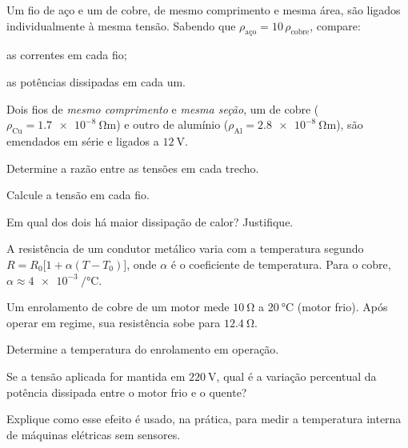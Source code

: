 \blocoaprofundamento
\begin{questao}[3]{}

Um fio de aço e um de cobre, de mesmo comprimento e mesma área, são ligados
individualmente à mesma tensão. Sabendo que
$\rho_{\text{aço}} = 10\,\rho_{\text{cobre}}$, compare:
\begin{itensq}
\item as correntes em cada fio;
\item as potências dissipadas em cada um.
\end{itensq}


\end{questao}
\begin{questao}[3]{}

Dois fios de \emph{mesmo comprimento} e \emph{mesma seção}, um de cobre
($\rho_{\text{Cu}}=\SI{1.7e-8}{\ohm\meter}$) e outro de alumínio
($\rho_{\text{Al}}=\SI{2.8e-8}{\ohm\meter}$), são emendados em série e ligados a
$\SI{12}{\volt}$.
\begin{itensq}
\item Determine a razão entre as tensões em cada trecho.
\item Calcule a tensão em cada fio.
\item Em qual dos dois há maior dissipação de calor? Justifique.
\end{itensq}


\end{questao}
\begin{questao}[3]{}

A resistência de um condutor metálico varia com a temperatura segundo
$R = R_0\big[1+\alpha(T-T_0)\big]$, onde $\alpha$ é o coeficiente de temperatura.
Para o cobre, $\alpha \approx \SI{4e-3}{\per\celsius}$.

Um enrolamento de cobre de um motor mede $\SI{10}{\ohm}$ a $\SI{20}{\celsius}$
(motor frio). Após operar em regime, sua resistência sobe para
$\SI{12.4}{\ohm}$.
\begin{itensq}
\item Determine a temperatura do enrolamento em operação.
\item Se a tensão aplicada for mantida em $\SI{220}{\volt}$, qual é a variação
      percentual da potência dissipada entre o motor frio e o quente?
\item Explique como esse efeito é usado, na prática, para medir a temperatura
      interna de máquinas elétricas sem sensores.
\end{itensq}


\end{questao}
